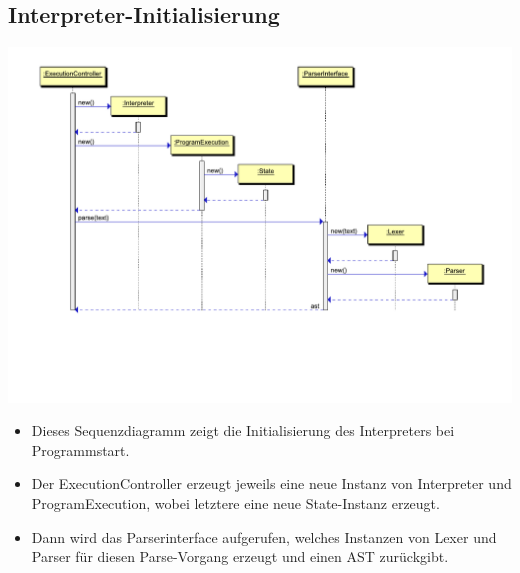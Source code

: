 \documentclass[10pt,a4paper,titlepage]{article}
\begin{document}
\subsection{Interpreter-Initialisierung}
\includegraphics[scale=0.9]{images/interpreter_init.pdf} \newline
\begin{itemize}
\item Dieses Sequenzdiagramm zeigt die Initialisierung des Interpreters bei Programmstart.
\item Der ExecutionController erzeugt jeweils eine neue Instanz von Interpreter und ProgramExecution, wobei letztere eine neue State-Instanz erzeugt.
\item Dann wird das Parserinterface aufgerufen, welches Instanzen von Lexer und Parser für diesen Parse-Vorgang erzeugt und einen AST zurückgibt.
\end{itemize}
\end{document}
